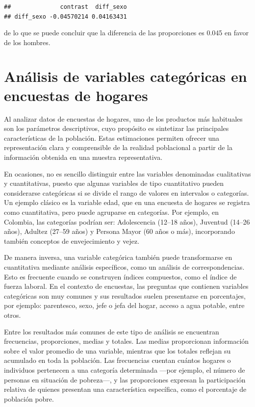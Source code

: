 \documentclass[
  12pt,
]{book}
\begin{document}
\begin{verbatim}
##              contrast  diff_sexo
## diff_sexo -0.04570214 0.04163431
\end{verbatim}

de lo que se puede concluir que la diferencia de las proporciones es 0.045 en favor de los hombres.

\chapter{Análisis de variables categóricas en encuestas de hogares}\label{anuxe1lisis-de-variables-categuxf3ricas-en-encuestas-de-hogares}

Al analizar datos de encuestas de hogares, uno de los productos más habituales son los parámetros descriptivos, cuyo propósito es sintetizar las principales características de la población. Estas estimaciones permiten ofrecer una representación clara y comprensible de la realidad poblacional a partir de la información obtenida en una muestra representativa.

En ocasiones, no es sencillo distinguir entre las variables denominadas cualitativas y cuantitativas, puesto que algunas variables de tipo cuantitativo pueden considerarse categóricas si se divide el rango de valores en intervalos o categorías. Un ejemplo clásico es la variable edad, que en una encuesta de hogares se registra como cuantitativa, pero puede agruparse en categorías. Por ejemplo, en Colombia, las categorías podrían ser: Adolescencia (12--18 años), Juventud (14--26 años), Adultez (27--59 años) y Persona Mayor (60 años o más), incorporando también conceptos de envejecimiento y vejez.

De manera inversa, una variable categórica también puede transformarse en cuantitativa mediante análisis específicos, como un análisis de correspondencias. Esto es frecuente cuando se construyen índices compuestos, como el índice de fuerza laboral. En el contexto de encuestas, las preguntas que contienen variables categóricas son muy comunes y sus resultados suelen presentarse en porcentajes, por ejemplo: parentesco, sexo, jefe o jefa del hogar, acceso a agua potable, entre otros.

Entre los resultados más comunes de este tipo de análisis se encuentran frecuencias, proporciones, medias y totales. Las medias proporcionan información sobre el valor promedio de una variable, mientras que los totales reflejan su acumulado en toda la población. Las frecuencias cuentan cuántos hogares o individuos pertenecen a una categoría determinada ---por ejemplo, el número de personas en situación de pobreza---, y las proporciones expresan la participación relativa de quienes presentan una característica específica, como el porcentaje de población pobre.
\end{document}
